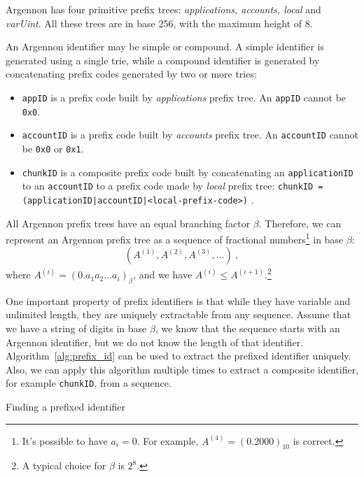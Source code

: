 Argennon has four primitive prefix trees:
\emph{applications, accounts, local} and \emph{varUint}.
All these trees are in base 256, with the maximum height
of 8.

An Argennon identifier may be simple or compound. A simple identifier is generated using a single trie, while a
compound identifier is generated by concatenating prefix codes generated by two or more tries:

\begin{itemize}
    \item \texttt{appID} is a prefix code built by \emph{applications} prefix tree. An \texttt{appID} cannot
    be \texttt{0x0}.

    \item \texttt{accountID} is a prefix code built by \emph{accounts} prefix tree. An \texttt{accountID} cannot
    be \texttt{0x0} or \texttt{0x1}.

    \item \texttt{chunkID} is a composite prefix code built by concatenating an \texttt{applicationID} to
    an \texttt{accountID} to a prefix code made by \emph{local} prefix tree:
    \subitem \texttt{chunkID = (applicationID|accountID|<local-prefix-code>)} .
\end{itemize}

All Argennon prefix trees have an equal branching factor \(\beta\). Therefore, we can represent an Argennon
prefix tree as a sequence of fractional numbers\footnote{It's possible to have \(a_i=0\).
For example, \(A^{(4)}=(0.2000)_{10}\) is correct.} in base \(\beta\):
\[
    (A^{(1)},A^{(2)},A^{(3)},\dots)\ ,
\]
where \(A^{(i)}=(0.a_{1}a_{2}\dots a_{i})_\beta\), and we have \(A^{(i)} \leq A^{(i+1)}\).\footnote{A typical choice for
    \(\beta\) is \(2^8\).}

One important property of prefix identifiers is that while they have variable and unlimited length, they are
uniquely extractable from any sequence. Assume that we have a string of digits in base $\beta$, we
know that the sequence starts with an Argennon identifier, but we do not know the length of that identifier.
Algorithm~\ref{alg:prefix_id} can be used to extract the prefixed identifier uniquely. Also, we can apply this algorithm
multiple times to extract a composite identifier, for example \texttt{chunkID}, from a sequence.

\begin{algorithm}[t]
    \DontPrintSemicolon
    \BlankLine
    \BlankLine
    {
        {
            \;
        }
    }
    \;
    \caption{Finding a prefixed identifier}\label{alg:prefix_id}
\end{algorithm}

